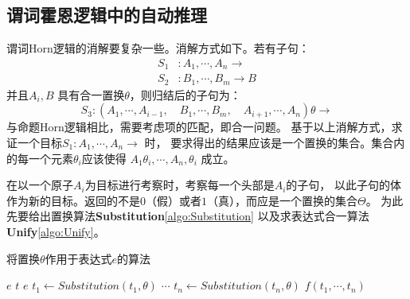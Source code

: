 \subsection{谓词霍恩逻辑中的自动推理}

谓词Horn逻辑的消解要复杂一些。消解方式如下。若有子句：
\begin{align*}
        S_1 &: A_1 , \cdots, A_n \rightarrow \\
        S_2 &: B_1 , \cdots, B_m \rightarrow B
\end{align*}
并且$A_i, B$ 具有合一置换$\theta$，则归结后的子句为：
\begin{equation*}
        S_3: (A_1, \cdots, A_{i-1}, \quad B_1, \cdots, B_m, \quad %
        A_{i+1}, \cdots, A_n) \theta \rightarrow
\end{equation*}
与命题Horn逻辑相比，需要考虑项的匹配，即合一问题。
基于以上消解方式，求证一个目标$S_1:A_1, \cdots, A_n \rightarrow$ 时，
要求得出的结果应该是一个置换的集合。集合内的每一个元素$\theta_i$应该使得
$A_1\theta_i,\cdots,A_n,\theta_i$ 成立。

在以一个原子$A_i$为目标进行考察时，考察每一个头部是$A_i$的子句，
以此子句的体作为新的目标。返回的不是$0$（假）或者$1$（真），而应是一个置换的集合$\Theta$。
为此先要给出置换算法\textbf{Substitution}\cref{algo:Substitution}
以及求表达式合一算法\textbf{Unify}\cref{algo:Unify}。

\begin{algorithm}[H]
        \caption{将置换$\theta$作用于表达式$e$的算法}
        \label{algo:Substitution}
        \begin{algorithmic}[1]
                                \State\Return $e$
                        \EndIf
                                        \State\Return $t$
                                \Else
                                        \State\Return $e$
                                \EndIf
                        \EndIf
                                \State $t_1  \gets Substitution(t_1, \theta)$
                                \State $\cdots$
                                \State $t_n  \gets Substitution(t_n, \theta)$
                                \State\Return $f(t_1,\cdots,t_n)$
                        \EndIf
                \EndFunction
        \end{algorithmic}
\end{algorithm}

